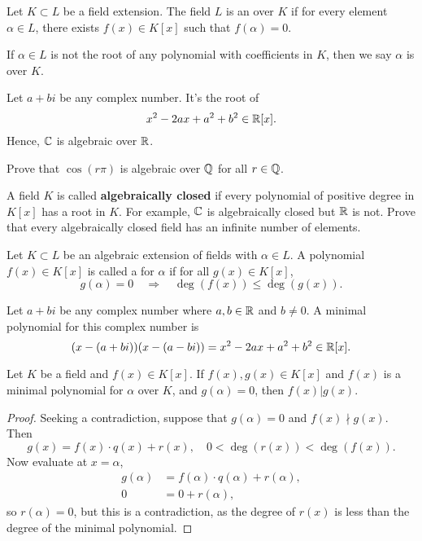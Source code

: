 \documentclass{ximera}
\begin{document}
\begin{definition}
  Let $K\subset L$ be a field extension. The field $L$ is an
   over $K$ if for every element $\alpha\in
  L$, there exists $f(x) \in K[x]$ such that $f(\alpha) = 0$.


  If $\alpha\in L$ is not the root of any polynomial with coefficients
  in $K$, then we say $\alpha$ is  over $K$.
\end{definition}

\begin{example}
  Let $a+ bi$ be any complex number. It's the root of
  \[
  x^2 -2ax + a^2 + b^2 \in \mathbb R[x].
  \]
  Hence, $\mathbb C$ is algebraic over $\mathbb R$.
\end{example}

\begin{exercise}
  Prove that $\cos(r\pi)$ is algebraic over $\mathbb Q$ for all $r\in\mathbb Q$.
\end{exercise}

\begin{exercise}
  A field $K$ is called \textbf{algebraically closed} if every
  polynomial of positive degree in $K[x]$ has a root in $K$. For
  example, $\mathbb C$ is algebraically closed but $\mathbb R$ is not. Prove that
  every algebraically closed field has an infinite number of elements.
\end{exercise}


\begin{definition}
  Let $K\subset L$ be an algebraic extension of fields with
  $\alpha\in L$. A polynomial $f(x)\in K[x]$ is called a  for $\alpha$ if for all $g(x)\in K[x]$,
  \[
  g(\alpha) = 0 \quad\Rightarrow\quad \deg(f(x)) \le \deg(g(x)).
  \]
\end{definition}

\begin{example}
  Let $a+bi$ be any complex number where $a,b\in\mathbb R$ and $b\ne 0$. A
  minimal polynomial for this complex number is
  \[
  (x-(a+bi))(x-(a-bi)) = x^2 -2ax +a^2 + b^2\in\mathbb R[x].
  \]
\end{example}

\begin{lemma}
  Let $K$ be a field and $f(x)\in K[x]$. If $f(x),g(x)\in K[x]$ and
  $f(x)$ is a minimal polynomial for $\alpha$ over $K$, and $g(\alpha)
  = 0$, then $f(x) | g(x)$.
  \begin{proof}
    Seeking a contradiction, suppose that $g(\alpha) = 0$ and $f(x)
    \nmid g(x)$. Then
    \[
    g(x) = f(x) \cdot q(x) + r(x), \quad 0<\deg(r(x))< \deg(f(x)).
    \]
    Now evaluate at $x = \alpha$,
    \begin{align*}
      g(\alpha) &= f(\alpha) \cdot q(\alpha) + r(\alpha),\\
      0 &= 0 + r(\alpha),
    \end{align*}
    so $r(\alpha)=0$, but this is a contradiction, as the degree of
    $r(x)$ is less than the degree of the minimal polynomial.
  \end{proof}
\end{lemma}
\end{document}
